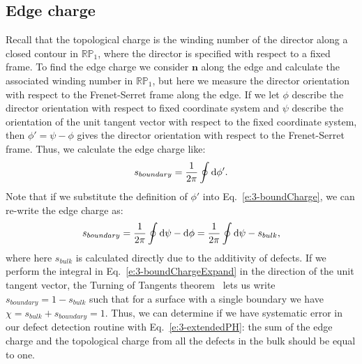\subsection{Edge charge}
Recall that the topological charge is the winding number of the director along a closed contour in $\mathbb{R}\mathbb{P}_1$, where the director is specified with respect to a fixed frame.
To find the edge charge we consider $\mathbf{n}$ along the edge and calculate the associated winding number in $\mathbb{R}\mathbb{P}_1$, but here we measure the director orientation with respect to the Frenet-Serret frame along the edge.
If we let $\phi$ describe the director orientation with respect to fixed coordinate system and $\psi$ describe the orientation of the unit tangent vector with respect to the fixed coordinate system, then $\phi' = \psi-\phi$ gives the director orientation with respect to the Frenet-Serret frame.
Thus, we calculate the edge charge like:
\begin{equation}
  s_{boundary} = \frac{1}{2\pi} \oint \textup{d}\phi'\label{e:3-boundCharge}.
\end{equation}
Note that if we substitute the definition of $\phi'$ into Eq.~\ref{e:3-boundCharge}, we can re-write the edge charge as:
\begin{equation}
  s_{boundary} = \frac{1}{2\pi} \oint \textup{d}\psi - \textup{d}\phi = \frac{1}{2\pi} \oint \textup{d}\psi - s_{bulk}\label{e:3-boundChargeExpand},
\end{equation}
where here $s_{bulk}$ is calculated directly due to the additivity of defects.
If we perform the integral in Eq.~\ref{e:3-boundChargeExpand} in the direction of the unit tangent vector, the Turning of Tangents theorem~\cite{RN35} lets us write $s_{boundary} = 1 - s_{bulk}$ such that for a surface with a single boundary we have $\chi = s_{bulk} + s_{boundary} = 1$.
Thus, we can determine if we have systematic error in our defect detection routine with Eq.~\ref{e:3-extendedPH}: the sum of the edge charge and the topological charge from all the defects in the bulk should be equal to one.\\

